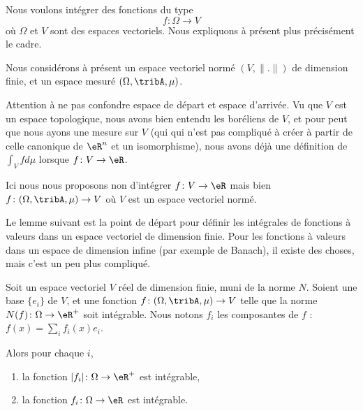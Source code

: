 Nous voulons intégrer des fonctions du type
\begin{equation}
    f \colon \Omega\to V
\end{equation}
où \( \Omega\) et \( V\) sont des espaces vectoriels. Nous expliquons à présent plus précisément le cadre.

\begin{normaltext}      \label{NORMooTQBIooBaScjt}
    Nous considérons à présent un espace vectoriel normé \( (V,\| . \|)\) de dimension finie, et un espace mesuré \( (\Omega,\tribA,\mu)\).

    Attention à ne pas confondre espace de départ et espace d'arrivée. Vu que \( V\) est un espace topologique, nous avons bien entendu les boréliens de \( V\), et pour peut que nous ayons une mesure sur \( V\) (qui qui n'est pas compliqué à créer à partir de celle canonique de \( \eR^n\) et un isomorphisme), nous avons déjà une définition de \( \int_Vfd\mu\) lorsque \( f\colon V\to \eR\).

    Ici nous nous proposons non d'intégrer \( f\colon V\to \eR\) mais bien \( f\colon (\Omega,\tribA,\mu)\to V\) où \( V\) est un espace vectoriel normé.

    Le lemme suivant est la point de départ pour définir les intégrales de fonctions à valeurs dans un espace vectoriel de dimension finie. Pour les fonctions à valeurs dans un espace de dimension infine (par exemple de Banach), il existe des choses, mais c'est un peu plus compliqué.
\end{normaltext}

\begin{lemma}        \label{LEMooCVHDooLJASAs}
    Soit un espace vectoriel \( V\) réel de dimension finie, muni de la norme \( N\). Soient une base \( \{ e_i \}\) de \( V\), et une fonction \( f\colon (\Omega,\tribA,\mu)\to V\) telle que la norme \( N(f)\colon \Omega\to \eR^+\) soit intégrable. Nous notons \( f_i\) les composantes de \( f\) : \( f(x)=\sum_if_i(x)e_i\).

    Alors pour chaque \( i\),
    \begin{enumerate}
        \item
            la fonction \( | f_i |\colon \Omega\to \eR^+\) est intégrable,
        \item
            la fonction \( f_i\colon \Omega\to \eR\) est intégrable.
    \end{enumerate}
\end{lemma}

